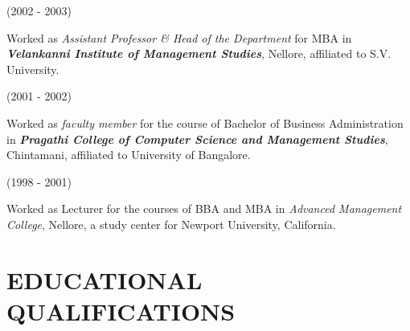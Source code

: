 \documentclass[10pt]{article}
\begin{document}
\begin{description}
\begin{comment}
\fbox{$1998 - 2003$} Worked as \emph{Assistant Professor}, Apollo Institute of Hospital Administration (AIHA), Film Nagar, Hyderabad. Taught \emph{statistics, research methodology, healthcare marketing, healthcare informatics}
\end{comment}

\item (2002 - 2003)

Worked as \textit{Assistant Professor \& Head of the Department} for MBA in \emph{\textbf{Velankanni Institute of Management Studies}}, Nellore, affiliated to S.V. University. 

\item (2001 - 2002)

Worked as \textit{faculty member} for the course of Bachelor of Business Administration in \emph{\textbf{Pragathi College of Computer Science and Management Studies}}, Chintamani, affiliated to University of Bangalore. 

\item (1998 - 2001)

Worked as Lecturer for the courses of BBA and MBA in \emph{Advanced Management College}, Nellore,  a study center for Newport University, California. \\ 

\end{description}


\section{EDUCATIONAL QUALIFICATIONS} \hline \vspace{0.5cm}
\end{document}
